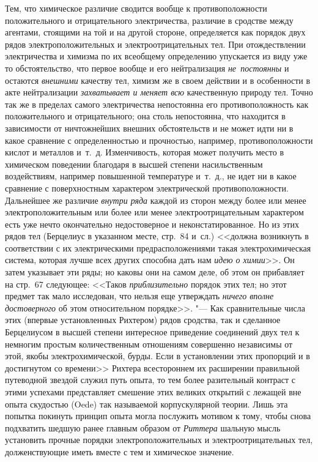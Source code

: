Тем, что химическое различие сводится вообще к противоположности положительного
и отрицательного электричества, различие в сродстве между агентами, стоящими на
той и на другой стороне, определяется как порядок двух рядов
электроположительных и электроотрицательных тел. При отождествлении
электричества и химизма по их всеобщему определению упускается из виду уже то
обстоятельство, что первое вообще и его нейтрализация {\em не~постоянны} и
остаются {\em внешними} качеству тел, химизм же в своем действии и в
особенности в акте нейтрализации {\em захватывает и меняет всю} качественную
природу тел. Точно так же в пределах самого электричества непостоянна его
противоположность как положительного и отрицательного; она столь непостоянна,
что находится в зависимости от ничтожнейших внешних обстоятельств и не может
идти ни в какое сравнение с определенностью и прочностью, например,
противоположности кислот и металлов и~т.~д. Изменчивость, которая может
получить место в химическом поведении благодаря в высшей степени насильственным
воздействиям, например повышенной температуре и~т.~д., не идет ни в какое
сравнение с поверхностным характером электрической противоположности.
Дальнейшее же различие {\em внутри ряда} каждой из сторон между более или менее
электроположительным или более или менее электроотрицательным характером есть
уже нечто окончательно недостоверное и неконстатированное. Но из этих рядов тел
(Берцелиус в указанном месте, стр.~84 и~сл.) <<должна возникнуть в соответствии
с их электрическими предрасположениями такая электрохимическая система, которая
лучше всех других способна дать нам {\em идею о химии}>>. Он затем указывает
эти ряды; но каковы они на самом деле, об этом он прибавляет на стр.~67
следующее: <<Таков {\em приблизительно} порядок этих тел; но этот предмет так
мало исследован, что нельзя еще утверждать {\em ничего вполне достоверного} об
этом относительном порядке>>. "--- Как сравнительные числа этих (впервые
установленных Рихтером) рядов сродства, так и сделанное Берцелиусом в высшей
степени интересное приведение соединений двух тел к немногим простым
количественным отношениям совершенно независимы от этой, якобы
электрохимической, бурды. Если в установлении этих пропорций и в достигнутом со
времени>> Рихтера всестороннем их расширении правильной путеводной звездой
служил путь опыта, то тем более разительный контраст с этими успехами
представляет смешение этих великих открытий с лежащей вне опыта скудостью
(Oede) так называемой корпускулярной теории. Лишь эта попытка покинуть принцип
опыта могла послужить мотивом к тому, чтобы снова подхватить шедшую ранее
главным образом от {\em Риттера} шальную мысль установить прочные порядки
электроположительных и электроотрицательных тел, долженствующие иметь вместе с
тем и химическое значение.

